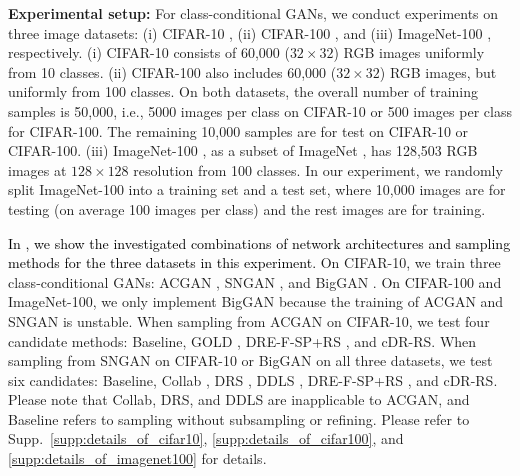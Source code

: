 \documentclass[final,12pt, 3p,times]{elsarticle}
\def\rev#1{\textcolor{black}{#1}}
\begin{document}
{\setlength{\parindent}{0cm} \textbf{Experimental setup:}}
For class-conditional GANs, we conduct experiments on three image datasets: (i) CIFAR-10 \cite{krizhevsky2009learning}, (ii) CIFAR-100 \cite{krizhevsky2009learning}, and (iii) ImageNet-100 \cite{cao2017hashnet}, respectively. (i) CIFAR-10 consists of 60,000 ($32\times32$) RGB images uniformly from 10 classes. (ii) CIFAR-100 also includes 60,000 ($32\times32$) RGB images, but uniformly from 100 classes.  On both datasets, the overall number of training samples is 50,000, i.e., 5000 images per class on CIFAR-10 or 500 images per class for CIFAR-100. The remaining 10,000 samples are for test on CIFAR-10 or CIFAR-100. (iii) ImageNet-100 \cite{cao2017hashnet}, as a subset of ImageNet \cite{imagenet_cvpr09}, has 128,503 RGB images at $128\times 128$ resolution from 100 classes. In our experiment, we randomly split ImageNet-100 into a training set and a test set, where 10,000 images are for testing (on average 100 images per class) and the rest images are for training. 

\rev{In , we show the investigated combinations of network architectures and sampling methods for the three datasets in this experiment.} 
On CIFAR-10, we train three class-conditional GANs: ACGAN \cite{odena2017conditional}, SNGAN \cite{miyato2018spectral}, and BigGAN \cite{brock2018large}. On CIFAR-100 and ImageNet-100, we only implement BigGAN because the training of ACGAN and SNGAN is unstable. When sampling from ACGAN on CIFAR-10, we test four candidate methods: Baseline, GOLD \cite{mo2019mining}, DRE-F-SP+RS \cite{ding2020subsampling}, and cDR-RS. When sampling from SNGAN on CIFAR-10 or BigGAN on all three datasets, we test six candidates: Baseline, Collab \cite{liu2020collaborative}, DRS \cite{azadi2018discriminator}, DDLS \cite{che2020your}, DRE-F-SP+RS \cite{ding2020subsampling}, and cDR-RS. Please note that Collab, DRS, and DDLS are inapplicable to ACGAN, and Baseline refers to sampling without subsampling or refining. Please refer to Supp.\ \ref{supp:details_of_cifar10}, \ref{supp:details_of_cifar100}, and \ref{supp:details_of_imagenet100} for details. 
\end{document}
